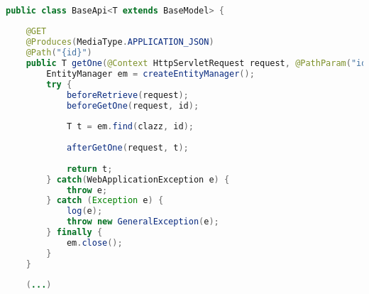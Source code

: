 \label{lst:baseapi}
\begin{lstlisting}[language=java, caption=BaseApi.java]

public class BaseApi<T extends BaseModel> {
	
	@GET
	@Produces(MediaType.APPLICATION_JSON)
	@Path("{id}")
	public T getOne(@Context HttpServletRequest request, @PathParam("id") int id) {
		EntityManager em = createEntityManager();
		try {
			beforeRetrieve(request);
			beforeGetOne(request, id);
			
			T t = em.find(clazz, id);
			
			afterGetOne(request, t);
			
			return t;
		} catch(WebApplicationException e) {
			throw e;
		} catch (Exception e) {
			log(e);
			throw new GeneralException(e);
		} finally {
			em.close();
		}
	}
	
	(...)

\end{lstlisting}